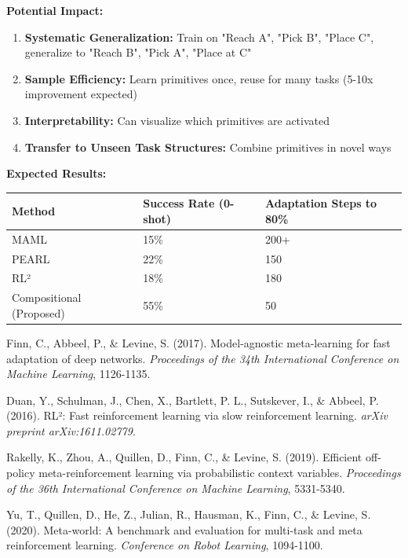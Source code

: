 \documentclass[12pt]{article}
\begin{document}
{{			\textbf{Potential Impact:}
			
			\begin{enumerate}
				\item \textbf{Systematic Generalization:} Train on {"Reach A", "Pick B", "Place C"}, generalize to {"Reach B", "Pick A", "Place at C"}
				\item \textbf{Sample Efficiency:} Learn primitives once, reuse for many tasks (5-10x improvement expected)
				\item \textbf{Interpretability:} Can visualize which primitives are activated
				\item \textbf{Transfer to Unseen Task Structures:} Combine primitives in novel ways
			\end{enumerate}
			
			\textbf{Expected Results:}
			
			\begin{center}
			\begin{tabular}{|l|l|l|}
			\hline
			\textbf{Method} & \textbf{Success Rate (0-shot)} & \textbf{Adaptation Steps to 80\%} \\
			\hline
			MAML & 15\% & 200+ \\
			PEARL & 22\% & 150 \\
			RL² & 18\% & 180 \\
			Compositional (Proposed) & 55\% & 50 \\
			\hline
			\end{tabular}
			\end{center}
			
			\begin{thebibliography}{9}
				
				Finn, C., Abbeel, P., \& Levine, S. (2017). Model-agnostic meta-learning for fast adaptation of deep networks. \textit{Proceedings of the 34th International Conference on Machine Learning}, 1126-1135.
				
				Duan, Y., Schulman, J., Chen, X., Bartlett, P. L., Sutskever, I., \& Abbeel, P. (2016). RL²: Fast reinforcement learning via slow reinforcement learning. \textit{arXiv preprint arXiv:1611.02779}.
				
				Rakelly, K., Zhou, A., Quillen, D., Finn, C., \& Levine, S. (2019). Efficient off-policy meta-reinforcement learning via probabilistic context variables. \textit{Proceedings of the 36th International Conference on Machine Learning}, 5331-5340.
				
				Yu, T., Quillen, D., He, Z., Julian, R., Hausman, K., Finn, C., \& Levine, S. (2020). Meta-world: A benchmark and evaluation for multi-task and meta reinforcement learning. \textit{Conference on Robot Learning}, 1094-1100.
				

\end{thebibliography}}}
\end{document}
